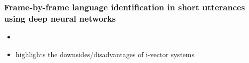     \subsubsection{Frame-by-frame language identification in short utterances using deep neural networks}
    \begin{itemize}
        \item \cite{gonzalez2015frame}
        \item highlights the downsides/disadvantages of i-vector systems
        
    \end{itemize}
    
    
    
    